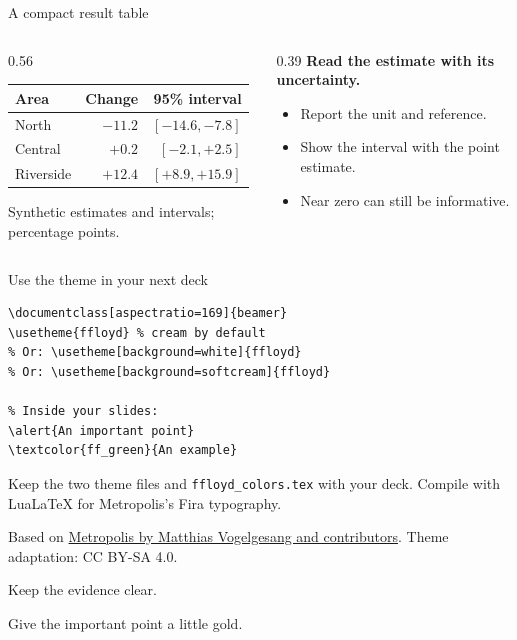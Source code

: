 \documentclass[10pt,aspectratio=169]{beamer}
\begin{document}
\begin{frame}{A compact result table}
  \begin{columns}[T,onlytextwidth]
    \begin{column}{0.56\textwidth}
      \begin{tabular}{@{}lrr@{}}
        \toprule
        \textbf{Area} & \textbf{Change} & \textbf{95\% interval} \\
        \midrule
        North      & $-11.2$ & $[-14.6,-7.8]$ \\
        Central    & $+0.2$  & $[-2.1,+2.5]$ \\
        Riverside  & $+12.4$ & $[+8.9,+15.9]$ \\
        \bottomrule
      \end{tabular}
      \vspace{0.5em}

      {\scriptsize Synthetic estimates and intervals; percentage points.}
    \end{column}
    \begin{column}{0.39\textwidth}
      \textbf{Read the estimate with its uncertainty.}
      \begin{itemize}
        \item Report the unit and reference.
        \item Show the interval with the point estimate.
        \item \alert{Near zero can still be informative.}
      \end{itemize}
    \end{column}
  \end{columns}
\end{frame}

\begin{frame}[fragile]{Use the theme in your next deck}
\begin{verbatim}
\documentclass[aspectratio=169]{beamer}
\usetheme{ffloyd} % cream by default
% Or: \usetheme[background=white]{ffloyd}
% Or: \usetheme[background=softcream]{ffloyd}

% Inside your slides:
\alert{An important point}
\textcolor{ff_green}{An example}
\end{verbatim}
  {\small Keep the two theme files and \texttt{ffloyd\_colors.tex} with your deck.
  Compile with LuaLaTeX for Metropolis's Fira typography.}
  \vspace{0.5em}

  {\scriptsize Based on \href{https://github.com/matze/mtheme}{Metropolis by Matthias Vogelgesang and contributors}.
  Theme adaptation: CC BY-SA 4.0.}
\end{frame}

\begin{frame}[standout]
  Keep the evidence clear.\par
  \vspace{0.4em}
  Give the important point \alert{a little gold}.
\end{frame}
\end{document}
